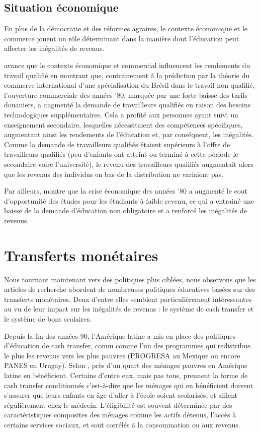 \documentclass[pagesize, twoside=off, bibliography=totoc, DIV=calc, fontsize=12pt, a4paper, french]{scrartcl}
\begin{document}
\subsection{Situation économique}

En plus de la démocratie et des réformes agraires, le contexte économique et le commerce jouent un rôle déterminant dans la manière dont l’éducation peut affecter les inégalités de revenus. 

 avance que le contexte économique et commercial influencent les rendements du travail qualifié en montrant que, contrairement à la prédiction par la théorie du commerce international d’une spécialisation du Brésil dans le travail non qualifié, l’ouverture commerciale des années ’80, marquée par une forte baisse des tarifs douaniers, a augmenté la demande de travailleurs qualifiés en raison des besoins technologiques supplémentaires. Cela a profité aux personnes ayant suivi un enseignement secondaire, lesquelles nécessitaient des compétences spécifiques, augmentant ainsi les rendements de l’éducation et, par conséquent, les inégalités. Comme la demande de travailleurs qualifiés étaient supérieurs à l’offre de travailleurs qualifiés (peu d’enfants ont atteint ou terminé à cette période le secondaire voire l’université), le revenu des travailleurs qualifiés augmentait alors que les revenus des individus en bas de la distribution ne variaient pas. 

Par ailleurs, \citet{urbina_intergenerational_2018} montre que la crise économique des années ’80 a augmenté le cout d’opportunité des études pour les étudiants à faible revenu, ce qui a entrainé une baisse de la demande d’éducation non obligatoire et a renforcé les inégalités de revenus.

\section{Transferts monétaires}

\label{sec_transferts}

Nous tournant maintenant vers des politiques plus ciblées, nous observons que les articles de recherche abordent de nombreuses politiques éducatives basées sur des transferts monétaires. Deux d’entre elles semblent particulièrement intéressantes au vu de leur impact sur les inégalités de revenus : le système de cash transfer et le système de bons scolaires.

Depuis la fin des années 90, l’Amérique latine a mis en place des politiques d’éducation de cash transfer, connu comme l’un des programmes qui redistribue le plus les revenus vers les plus pauvres (PROGRESA au Mexique ou encore PANES en Urugay). Selon \citet{levy_latin_2013}, près d’un quart des ménages pauvres en Amérique latine en bénéficient. Certains d’entre eux, mais pas tous, prennent la forme de cash transfer conditionnés c’est-à-dire que les ménages qui en bénéficient doivent s’assurer que leurs enfants en âge d’aller à l’école soient scolarisés, et aillent régulièrement chez le médecin. L’éligibilité est souvent déterminée par des caractéristiques composites des ménages comme les actifs détenus, l’accès à certains services sociaux, et sont corrélés à la consommation ou aux revenus.
\end{document}

